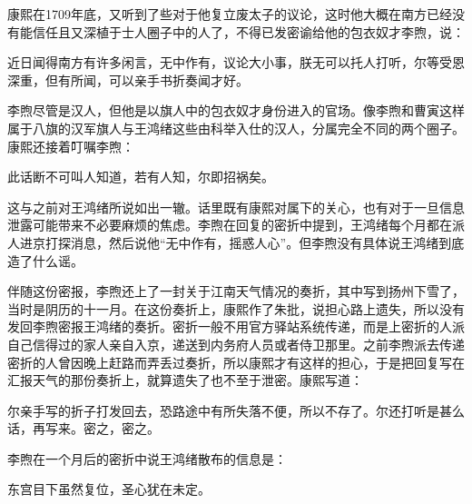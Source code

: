 
康熙在1709年底，又听到了些对于他复立废太子的议论，这时他大概在南方已经没有能信任且又深植于士人圈子中的人了，不得已发密谕给他的包衣奴才李煦，说：



\begin{bookquote}近日闻得南方有许多闲言，无中作有，议论大小事，朕无可以托人打听，尔等受恩深重，但有所闻，可以亲手书折奏闻才好。\end{bookquote}


李煦尽管是汉人，但他是以旗人中的包衣奴才身份进入的官场。像李煦和曹寅这样属于八旗的汉军旗人与王鸿绪这些由科举入仕的汉人，分属完全不同的两个圈子。康熙还接着叮嘱李煦：



\begin{bookquote}此话断不可叫人知道，若有人知，尔即招祸矣。\end{bookquote}


这与之前对王鸿绪所说如出一辙。话里既有康熙对属下的关心，也有对于一旦信息泄露可能带来不必要麻烦的焦虑。李煦在回复的密折中提到，王鸿绪每个月都在派人进京打探消息，然后说他“无中作有，摇惑人心”。但李煦没有具体说王鸿绪到底造了什么谣。



伴随这份密报，李煦还上了一封关于江南天气情况的奏折，其中写到扬州下雪了，当时是阴历的十一月。在这份奏折上，康熙作了朱批，说担心路上遗失，所以没有发回李煦密报王鸿绪的奏折。密折一般不用官方驿站系统传递，而是上密折的人派自己信得过的家人亲自入京，递送到内务府人员或者侍卫那里。之前李煦派去传递密折的人曾因晚上赶路而弄丢过奏折，所以康熙才有这样的担心，于是把回复写在汇报天气的那份奏折上，就算遗失了也不至于泄密。康熙写道：



\begin{bookquote}尔亲手写的折子打发回去，恐路途中有所失落不便，所以不存了。尔还打听是甚么话，再写来。密之，密之。\end{bookquote}


李煦在一个月后的密折中说王鸿绪散布的信息是：



\begin{bookquote}东宫目下虽然复位，圣心犹在未定。\end{bookquote}

